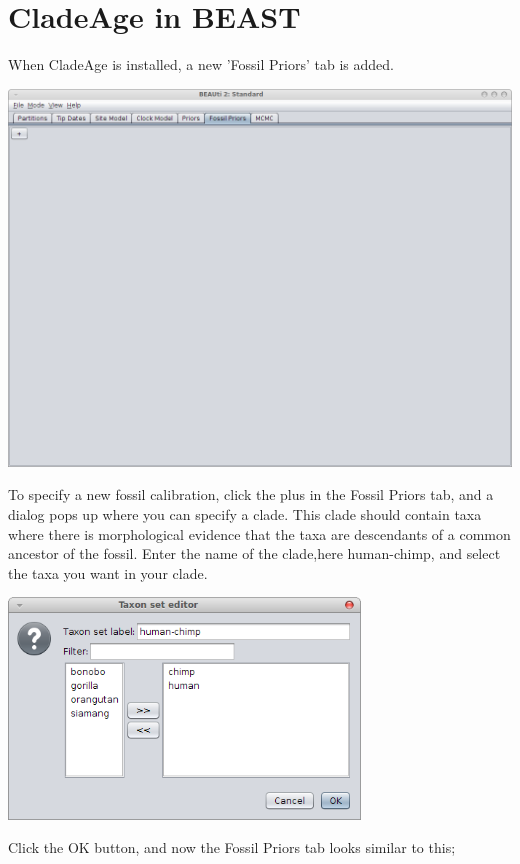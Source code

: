 \documentclass{article}
\begin{document}
\section{CladeAge in BEAST}
When CladeAge is installed, a new 'Fossil Priors' tab is added.
\begin{center}\includegraphics[width=\textwidth,clip=true,trim=0 300 0 0]{fossilPriorsTab.png}\end{center}
To specify a new fossil calibration, click the plus in the Fossil Priors tab, 
and a dialog pops up where you can specify a clade. This clade should contain
taxa where there is morphological evidence that the taxa are descendants of
a common ancestor of the fossil. Enter the name of the clade,here 
human-chimp, and select the taxa you want in your clade.
\begin{center}\includegraphics[width=0.7\textwidth]{taxonSetDialog.png}\end{center}
Click the OK button, and now the Fossil Priors tab looks similar to this;
\end{document}
